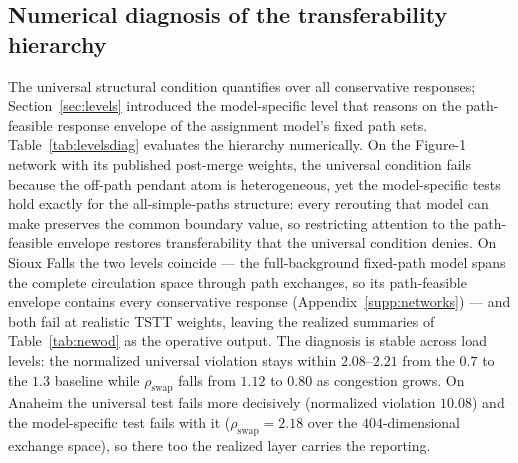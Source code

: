 \subsection{Numerical diagnosis of the transferability hierarchy}\label{supp:levelsdiag}
The universal structural condition quantifies over all conservative
responses; Section~\ref{sec:levels} introduced the model-specific level
that reasons on the path-feasible response envelope of the assignment
model's fixed path sets.
Table~\ref{tab:levelsdiag} evaluates the hierarchy numerically. On the
Figure-1 network with its published post-merge weights, the universal
condition fails because the off-path pendant atom is heterogeneous, yet
the model-specific tests hold exactly for the all-simple-paths
structure: every rerouting that model can make preserves the common
boundary value, so restricting attention to the path-feasible envelope
restores transferability that the universal condition denies. On Sioux
Falls the two levels coincide --- the full-background fixed-path model
spans the complete circulation space through path exchanges, so its
path-feasible envelope contains every conservative response
(Appendix~\ref{supp:networks}) --- and both fail at realistic TSTT
weights, leaving the realized summaries of Table~\ref{tab:newod} as the
operative output. The diagnosis is stable across load levels: the
normalized universal violation stays within $2.08$--$2.21$ from the
$0.7$ to the $1.3$ baseline while $\rho_{\mathrm{swap}}$ falls from
$1.12$ to $0.80$ as congestion grows. On Anaheim the universal test
fails more decisively (normalized violation $10.08$) and the
model-specific test fails with it ($\rho_{\mathrm{swap}}=2.18$ over the
$404$-dimensional exchange space), so there too the realized layer
carries the reporting.

